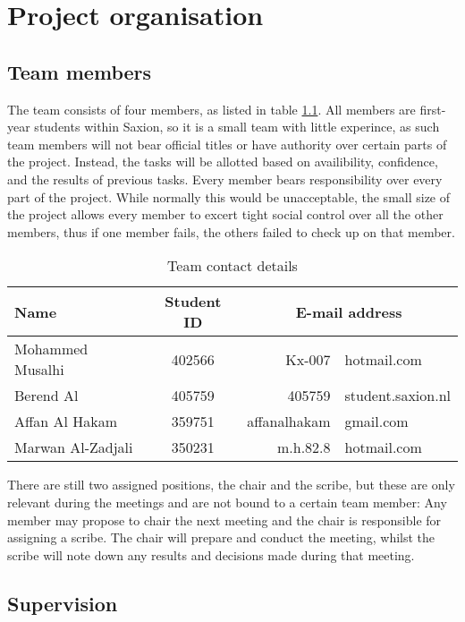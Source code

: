 \chapter{Project organisation}

\section{Team members}

The team consists of four members, as listed in table \ref{tbl:contactdetails}. All members are first-year students within Saxion, so it is a small team with little experince, as such team members will not bear official titles or have authority over certain parts of the project. Instead, the tasks will be allotted based on availibility, confidence, and the results of previous tasks. Every member bears responsibility over every part of the project. While normally this would be unacceptable, the small size of the project allows every member to excert tight social control over all the other members, thus if one member fails, the others failed to check up on that member.

\begin{table}
\centering
\caption{Team contact details}
\begin{tabular}{lc r @{@} l}
\\
Name & Student ID & \multicolumn{2}{c}{E-mail address} \\
\hline
Mohammed Musalhi & 402566 & Kx-007&hotmail.com \\
Berend Al & 405759 & 405759&student.saxion.nl \\
Affan Al Hakam & 359751 & affanalhakam&gmail.com \\
Marwan Al-Zadjali & 350231 & m.h.82.8&hotmail.com \\
\end{tabular}
\label{tbl:contactdetails}
\end{table}

There are still two assigned positions, the chair and the scribe, but these are only relevant during the meetings and are not bound to a certain team member: Any member may propose to chair the next meeting and the chair is responsible for assigning a scribe. The chair will prepare and conduct the meeting, whilst the scribe will note down any results and decisions made during that meeting.

\section{Supervision}

